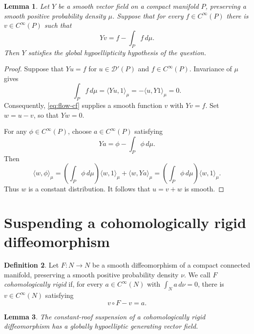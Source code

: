 \documentclass[11pt]{article}
\newtheorem{lemma}{Lemma}
\theoremstyle{definition}
\newtheorem{definition}[lemma]{Definition}
\theoremstyle{remark}
\newcommand{\Dprime}{\mathcal{D}'}
\begin{document}
\begin{lemma}\label{lem:cf-gh}
Let $Y$ be a smooth vector field on a compact manifold $P$, preserving
a smooth positive probability density $\mu$. Suppose that for every
$f\in C^\infty(P)$ there is $v\in C^\infty(P)$ such that
\begin{equation}\label{eq:flow-cf}
 Yv=f-\int_P f\,d\mu.
\end{equation}
Then $Y$ satisfies the global hypoellipticity hypothesis of the question.
\end{lemma}

\begin{proof}
Suppose that $Yu=f$ for $u\in\Dprime(P)$ and $f\in C^\infty(P)$.
Invariance of $\mu$ gives
\[
 \int_P f\,d\mu
 =
 \langle Yu,1\rangle_\mu
 =
 -\langle u,Y1\rangle_\mu
 =
 0.
\]
Consequently, \eqref{eq:flow-cf} supplies a smooth function $v$ with
$Yv=f$. Set $w=u-v$, so that $Yw=0$.

For any $\phi\in C^\infty(P)$, choose $a\in C^\infty(P)$ satisfying
\[
 Ya=\phi-\int_P\phi\,d\mu.
\]
Then
\[
 \langle w,\phi\rangle_\mu
 =
 \left(\int_P\phi\,d\mu\right)\langle w,1\rangle_\mu
 +\langle w,Ya\rangle_\mu
 =
 \left(\int_P\phi\,d\mu\right)\langle w,1\rangle_\mu.
\]
Thus $w$ is a constant distribution. It follows that $u=v+w$ is smooth.
\end{proof}

\section{Suspending a cohomologically rigid diffeomorphism}

\begin{definition}
Let $F:N\to N$ be a smooth diffeomorphism of a compact connected
manifold, preserving a smooth positive probability density $\nu$.
We call $F$ \emph{cohomologically rigid} if, for every
$a\in C^\infty(N)$ with $\int_N a\,d\nu=0$, there is
$v\in C^\infty(N)$ satisfying
\begin{equation}\label{eq:map-cf}
 v\circ F-v=a.
\end{equation}
\end{definition}

\begin{lemma}\label{lem:suspension}
The constant-roof suspension of a cohomologically rigid diffeomorphism
has a globally hypoelliptic generating vector field.
\end{lemma}
\end{document}
